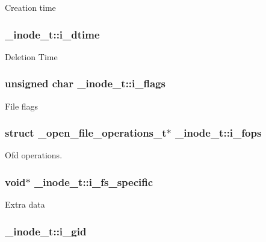 Creation time \hypertarget{struct__inode__t_a393de4c58241168fdf397ab8421a3539}{
\subsubsection[{i\-\_\-dtime}]{ \-\_\-inode\-\_\-t\-::i\-\_\-dtime}}\label{struct__inode__t_a393de4c58241168fdf397ab8421a3539}
Deletion Time \hypertarget{struct__inode__t_a36ff48a57a9e483d74682972d31ef46c}{
\subsubsection[{i\-\_\-flags}]{\setlength{\rightskip}{0pt plus 5cm}unsigned char \-\_\-inode\-\_\-t\-::i\-\_\-flags}}\label{struct__inode__t_a36ff48a57a9e483d74682972d31ef46c}
File flags \hypertarget{struct__inode__t_acf149d7d1601f78142b1eec480badf7e}{
\subsubsection[{i\-\_\-fops}]{\setlength{\rightskip}{0pt plus 5cm}struct {\bf \-\_\-open\-\_\-file\-\_\-operations\-\_\-t}$\ast$ \-\_\-inode\-\_\-t\-::i\-\_\-fops}}\label{struct__inode__t_acf149d7d1601f78142b1eec480badf7e}
Ofd operations. \hypertarget{struct__inode__t_a54e34439c448c46bae90fd040dadc5c0}{
\subsubsection[{i\-\_\-fs\-\_\-specific}]{\setlength{\rightskip}{0pt plus 5cm}void$\ast$ \-\_\-inode\-\_\-t\-::i\-\_\-fs\-\_\-specific}}\label{struct__inode__t_a54e34439c448c46bae90fd040dadc5c0}
Extra data \hypertarget{struct__inode__t_a95d052a6e9b1b1e4f6837fa0f33b393e}{
\subsubsection[{i\-\_\-gid}]{ \-\_\-inode\-\_\-t\-::i\-\_\-gid}}\label{struct__inode__t_a95d052a6e9b1b1e4f6837fa0f33b393e}
